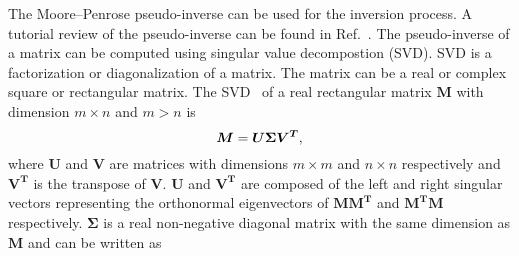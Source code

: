 The Moore--Penrose pseudo-inverse can be used for the inversion process. A tutorial review of the pseudo-inverse can be found in Ref.~\cite{pseudo}. The pseudo-inverse of a matrix can be computed using singular value decompostion (SVD). SVD is a factorization or diagonalization of a matrix. The matrix can be a real or complex square or rectangular matrix. The SVD~\cite{tikhonov_book,svd2,svd3} of a real rectangular matrix $\bm{M}$ with dimension $m \times n$ and $m>n$ is 
\begin{equation}\label{eq:m}
    \bm{M} = \bm{U} \bm{\Sigma} \bm{V^T}{\rm ,}
\end{equation}
where $\bm{U}$ and $\bm{V}$ are matrices with dimensions $m \times m$ and $n \times n$ respectively and $\bm{V^T}$ is the transpose of $\bm{V}$. $\bm{U}$ and $\bm{V^T}$ are composed of the left and right singular vectors representing the orthonormal eigenvectors of $\bm{M}\bm{M^T}$ and $\bm{M^T}\bm{M}$ respectively. $\bm{\Sigma}$ is a real non-negative diagonal matrix with the same dimension as  $\bm{M}$ and can be written as

